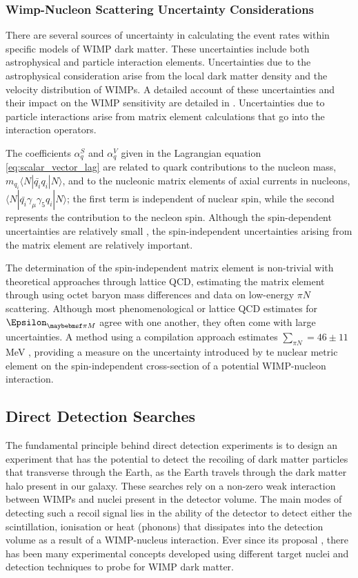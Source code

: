 {\subsubsection{Wimp-Nucleon Scattering Uncertainty Considerations}
\label{subsec:wimp_uncertainty}

There are several sources of uncertainty in calculating the event rates within specific models of WIMP dark matter. These uncertainties include both astrophysical and particle interaction elements. Uncertainties due to the astrophysical consideration arise from the local dark matter density and the velocity distribution of WIMPs. A detailed account of these uncertainties and their impact on the WIMP sensitivity are detailed in \cite{ibles}. Uncertainties due to particle interactions arise from matrix element calculations that go into the interaction operators.

The coefficients $\alpha^{S}_{q}$ and $\alpha^{V}_{q}$ given in the Lagrangian equation \ref{eq:scalar_vector_lag} are related to quark contributions to the nucleon mass, $ m_{q_{i}} \langle N|\bar{q_{i}}q_{i}|N \rangle$, and to the nucleonic matrix elements of axial currents in nucleons, $\langle N|\bar{q_{i}}\gamma_{\mu}\gamma_{5}q_{i}|N \rangle$; the first term is independent of nuclear spin, while the second represents the contribution to the necleon spin. Although the spin-dependent uncertainties are relatively small \cite{Ellis:2018dmb}, the spin-independent uncertainties arising from the matrix element are relatively important. 

The determination of the spin-independent matrix element is non-trivial with theoretical approaches through lattice QCD, estimating the matrix element through using octet baryon mass differences and data on low-energy $\pi N$ scattering. Although most phenomenological or lattice QCD estimates for $\Epsilon_{\pi M}$ agree with one another, they often come with large uncertainties. A method using a compilation approach estimates $\sum_{\pi N} = 46 \pm 11$ MeV \cite{Ellis:2018dmb}, providing a measure on the uncertainty introduced by te nuclear metric element on the spin-independent cross-section of a potential WIMP-nucleon interaction. 


\subsection{Direct Detection Searches}
\label{subsec:direct_searches}

The fundamental principle behind direct detection experiments is to design an experiment that has the potential to detect the recoiling of dark matter particles that transverse through the Earth, as the Earth travels through the dark matter halo present in our galaxy. These searches rely on a non-zero weak interaction between WIMPs and nuclei present in the detector volume. The main modes of detecting such a recoil signal lies in the ability of the detector to detect either the scintillation, ionisation or heat (phonons) that dissipates into the detection volume as a result of a WIMP-nucleus interaction. Ever since its proposal \cite{Detectability_of_dm}, there has been many experimental concepts developed using different target nuclei and detection techniques to probe for WIMP dark matter. 

}
